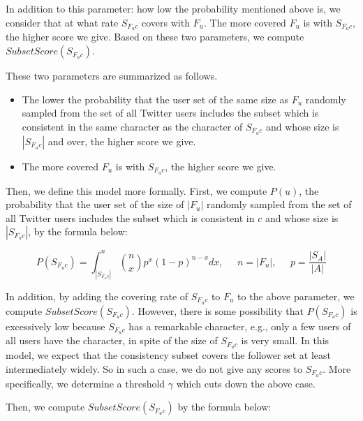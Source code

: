 In addition to this parameter: how low the probability mentioned above
is, we consider that at what rate $S_{F_uc}$ covers with $F_u$.  The
more covered $F_u$ is with $S_{F_uc}$, the higher score we give.  Based
on these two parameters, we compute $\mathit{SubsetScore(S_{F_uc})}$.

These two parameters are summarized as follows.
\begin{itemize}
\item The lower the probability that the user set of the same size as $F_u$
randomly sampled from the set of all Twitter users includes the subset
which is consistent in the same character as the character of $S_{F_uc}$
and whose size is $|S_{F_uc}|$ and over, the higher score we give.
\item The more covered $F_u$ is with $S_{F_uc}$, the higher score we give.
\end{itemize}

Then, we define this model more formally.  First, we compute $P(u)$, the
probability that the user set of the size of $|F_u|$ randomly sampled
from the set of all Twitter users includes the subset which is
consistent in $c$ and whose size is $|S_{F_uc}|$, by the formula below:

\vspace{-1ex}
\[
 P(S_{F_uc}) = \int_{|S_{F_uc}|}^{n} \binom{n}{x} p^x (1-p)^{n - x}
 dx,\;\;\;\;\;n = |F_u|,\;\;\;\;\;p = \frac{|S_A|}{|A|}
\]
\vspace{-2ex}


In addition, by adding the covering rate of $S_{F_uc}$ to $F_u$ to the
above parameter, we compute $\mathit{SubsetScore(S_{F_uc})}$.  However,
there is some possibility that $P(S_{F_uc})$ is excessively low because
$S_{F_uc}$ has a remarkable character, e.g., only a few users of all
users have the character, in spite of the size of $S_{F_uc}$ is very
small.  In this model, we expect that the consistency subset covers the
follower set at least intermediately widely.  So in such a case, we do
not give any scores to $S_{F_uc}$.  More specifically, we determine a
threshold $\gamma$ which cuts down the above case.

Then, we compute $\mathit{SubsetScore(S_{F_uc})}$ by the formula below:


